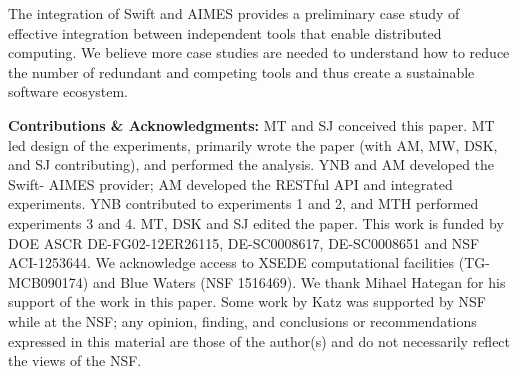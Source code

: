 \documentclass[10pt, conference, compsocconf]{IEEEtran}
\begin{document}
The integration of Swift and AIMES provides a preliminary case study of
effective integration between independent tools that enable distributed
computing.  We believe more case studies are needed to understand how to
reduce the number of redundant and competing tools and thus create a
sustainable software ecosystem. \\




{\footnotesize {\bf Contributions \& Acknowledgments:} MT and SJ conceived
this paper. MT led design of the experiments, primarily wrote the paper (with
AM, MW, DSK, and SJ contributing), and performed the analysis. YNB and AM
developed the Swift- AIMES provider; AM developed the RESTful API and
integrated experiments. YNB contributed to experiments 1 and 2, and MTH
performed experiments 3 and 4.  MT, DSK and SJ edited the paper. This work is
funded by DOE ASCR DE-FG02-12ER26115, DE-SC0008617, DE-SC0008651 and NSF
ACI-1253644. We acknowledge access to XSEDE computational facilities (TG-
MCB090174) and Blue Waters (NSF 1516469). We thank Mihael Hategan for his
support of the work in this paper. Some work by Katz was supported by NSF
while at the NSF; any opinion, finding, and conclusions or recommendations
expressed in this material are those of the author(s) and do not necessarily
reflect the views of the NSF.\par}

\vspace*{1em}
\newcommand{\BIBdecl}{\setlength{\itemsep}{0.25 em}}


\end{document}
